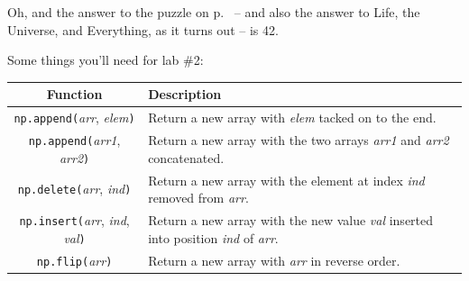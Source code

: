 Oh, and the answer to the puzzle on p.~\pageref{indexTest} -- and also the
answer to Life, the Universe, and Everything, as it turns out -- is 42.

\pagebreak

\vspace{1in}

\begin{center}
\Large Some things you'll need for lab \#2:
\end{center}

\normalsize
\setlength\extrarowheight{5pt}

\begin{tabular}{c|p{3.3in}}
Function & Description \\
\hline
\texttt{np.append(}\textsl{arr}, \textsl{elem}\texttt{)} &
    Return a new array with \textsl{elem} tacked on to the end. \\
\texttt{np.append(}\textsl{arr1}, \textsl{arr2}\texttt{)} &
    Return a new array with the two arrays \textsl{arr1} and \textsl{arr2} concatenated. \\
\texttt{np.delete(}\textsl{arr}, \textsl{ind}\texttt{)} &
    Return a new array with the element at index \textsl{ind} removed from \textsl{arr}. \\
\texttt{np.insert(}\textsl{arr}, \textsl{ind}, \textsl{val}\texttt{)} &
    Return a new array with the new value \textsl{val} inserted into position \textsl{ind} of \textsl{arr}. \\
\texttt{np.flip(}\textsl{arr}\texttt{)} &
    Return a new array with \textsl{arr} in reverse order. \\
\end{tabular}

